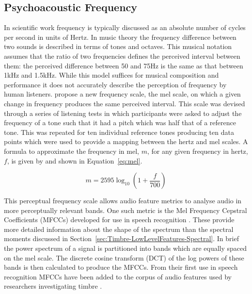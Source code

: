 	\subsection{Psychoacoustic Frequency}
	\label{sec:Timbre-PsychoacousticPrinciples-Frequency}
		In scientific work frequency is typically discussed as an absolute number of cycles per second in units of
		Hertz. In music theory the frequency difference between two sounds is described in terms of tones and
		octaves.  This musical notation assumes that the ratio of two frequencies defines the perceived interval
		between them: the perceived difference between 50 and 75Hz is the same as that between 1kHz and 1.5kHz.
		While this model suffices for musical composition and performance it does not accurately describe the
		perception of frequency by human listeners. \citet{stevens1937a} propose a new frequency scale, the mel
		scale, on which a given change in frequency produces the same perceived interval. This scale was devised
		through a series of listening tests in which participants were asked to adjust the frequency of a tone such
		that it had a pitch which was half that of a reference tone. This was repeated for ten individual reference
		tones producing ten data points which were used to provide a mapping between the hertz and mel scales. A
		formula to approximate the frequency in mel, $m$, for any given frequency in hertz, $f$, is given by
		\citet{oshaughnessy2000speech} and shown in Equation~\ref{eq:mel}.

		\begin{equation}
			m = 2595 \log_{10} \left(1 + \frac{f}{700} \right)
			\label{eq:mel}
		\end{equation}

		This perceptual frequency scale allows audio feature metrics to analyse audio in more perceptually relevant
		bands. One such metric is the Mel Frequency Cepstral Coefficients (MFCCs) developed for use in speech
		recognition \citep{davis1980comparison}. These provide more detailed information about the shape of the
		spectrum than the spectral moments discussed in Section~\ref{sec:Timbre-LowLevelFeatures-Spectral}. In
		brief the power spectrum of a signal is partitioned into bands which are equally spaced on the mel scale.
		The discrete cosine transform (DCT) of the log powers of these bands is then calculated to produce the
		MFCCs. From their first use in speech recognition MFCCs have been added to the corpus of audio features
		used by researchers investigating timbre \citep{depoli1997sonological}. 

